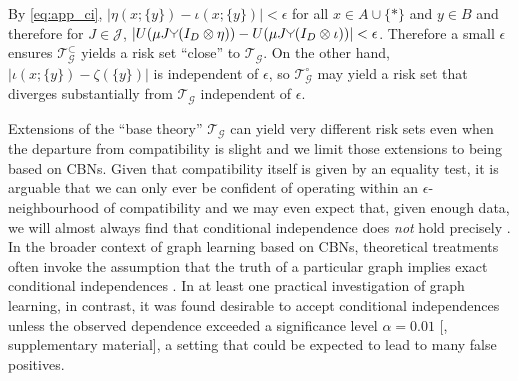 \begin{example}
By \ref{eq:app_ci}, $|\eta(x;\{y\})-\iota(x;\{y\})|<\epsilon$ for all $x\in A\cup\{*\}$ and $y\in B$ and therefore for $J\in \mathscr{J}$, $|U(\mu J\splitter{0.1} (I_D\otimes \eta)) - U(\mu J\splitter{0.1} (I_D\otimes \iota))|<\epsilon$. Therefore a small $\epsilon$ ensures $\mathscr{T}^\subset_{\mathcal{G}}$ yields a risk set ``close'' to $\mathscr{T}_{\mathcal{G}}$. On the other hand, $|\iota(x;\{y\})-\zeta(\{y\})|$ is independent of $\epsilon$, so $\mathscr{T}^\circ_{\mathcal{G}}$ may yield a risk set that diverges substantially from $\mathscr{T}_{\mathcal{G}}$ independent of $\epsilon$.

\end{example}

Extensions of the ``base theory'' $\mathscr{T}_{\mathcal{G}}$ can yield very different risk sets even when the departure from compatibility is slight and we limit those extensions to being based on CBNs. Given that compatibility itself is given by an equality test, it is arguable that we can only ever be confident of operating within an $\epsilon$-neighbourhood of compatibility and we may even expect that, given enough data, we will almost always find that conditional independence does \emph{not} hold precisely \citep{gelman_bayesian_2010,meehl_theory-testing_1967,berkson_difficulties_1938}. In the broader context of graph learning based on CBNs, theoretical treatments often invoke the assumption that the truth of a particular graph implies exact conditional independences \citep{meek_strong_1995}. In at least one practical investigation of graph learning, in contrast, it was found desirable to accept conditional independences unless the observed dependence exceeded a significance level $\alpha=0.01$ [\cite{maathuis_predicting_2010}, supplementary material], a setting that could be expected to lead to many false positives.